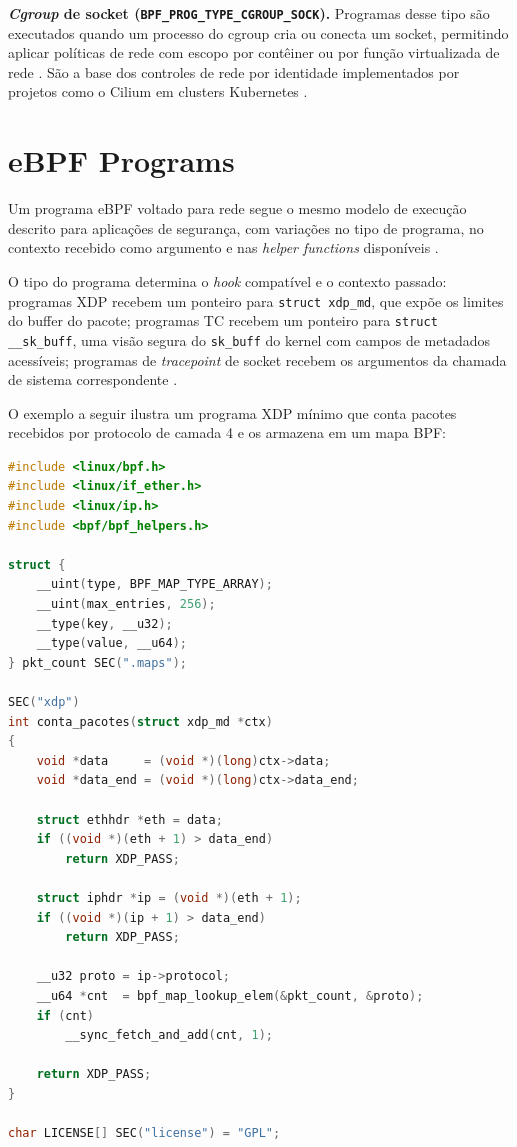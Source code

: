 \textbf{\textit{Cgroup} de socket (\texttt{BPF\_PROG\_TYPE\_CGROUP\_SOCK}).}
Programas desse tipo são executados quando um processo do cgroup cria ou conecta
um socket, permitindo aplicar políticas de rede com escopo por contêiner ou por
função virtualizada de rede \cite{linuxkernel2024}.
São a base dos controles de rede por identidade implementados por projetos como
o Cilium em clusters Kubernetes \cite{cassagnes2020}.

\section{eBPF Programs}

Um programa eBPF voltado para rede segue o mesmo modelo de execução descrito
para aplicações de segurança, com variações no tipo de programa, no contexto
recebido como argumento e nas \textit{helper functions} disponíveis
\cite{linuxkernel2024}.

O tipo do programa determina o \textit{hook} compatível e o contexto passado:
programas XDP recebem um ponteiro para \texttt{struct xdp\_md}, que expõe os
limites do buffer do pacote; programas TC recebem um ponteiro para
\texttt{struct \_\_sk\_buff}, uma visão segura do \texttt{sk\_buff} do kernel
com campos de metadados acessíveis; programas de \textit{tracepoint} de socket
recebem os argumentos da chamada de sistema correspondente \cite{linuxkernel2024}.

O exemplo a seguir ilustra um programa XDP mínimo que conta pacotes recebidos
por protocolo de camada 4 e os armazena em um mapa BPF:

\begin{lstlisting}[language=C,
  caption={Programa XDP que conta pacotes por protocolo L4.}]
#include <linux/bpf.h>
#include <linux/if_ether.h>
#include <linux/ip.h>
#include <bpf/bpf_helpers.h>

struct {
    __uint(type, BPF_MAP_TYPE_ARRAY);
    __uint(max_entries, 256);
    __type(key, __u32);
    __type(value, __u64);
} pkt_count SEC(".maps");

SEC("xdp")
int conta_pacotes(struct xdp_md *ctx)
{
    void *data     = (void *)(long)ctx->data;
    void *data_end = (void *)(long)ctx->data_end;

    struct ethhdr *eth = data;
    if ((void *)(eth + 1) > data_end)
        return XDP_PASS;

    struct iphdr *ip = (void *)(eth + 1);
    if ((void *)(ip + 1) > data_end)
        return XDP_PASS;

    __u32 proto = ip->protocol;
    __u64 *cnt  = bpf_map_lookup_elem(&pkt_count, &proto);
    if (cnt)
        __sync_fetch_and_add(cnt, 1);

    return XDP_PASS;
}

char LICENSE[] SEC("license") = "GPL";
\end{lstlisting}

